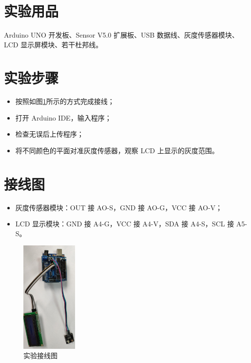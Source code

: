 \documentclass[UTF8, oneside]{ctexbook}
\begin{document}
\section{实验用品}
\paragraph{}
Arduino UNO 开发板、Sensor V5.0 扩展板、USB 数据线、灰度传感器模块、LCD 显示屏模块、若干杜邦线。

\section{实验步骤}
\begin{itemize}
    \item[(1)] 按照如图\ref{s6_line}所示的方式完成接线；
    \item[(2)] 打开 Arduino IDE，输入程序；
    \item[(3)] 检查无误后上传程序；
    \item[(4)] 将不同颜色的平面对准灰度传感器，观察 LCD 上显示的灰度范围。
\end{itemize}

\section{接线图}
\begin{itemize}
    \item 灰度传感器模块：OUT 接 AO-S，GND 接 AO-G，VCC 接 AO-V；
    \item LCD 显示模块：GND 接 A4-G，VCC 接 A4-V，SDA 接 A4-S，SCL 接 A5-S。
\end{itemize}
\begin{figure}[h]
    \centering
    \includegraphics[width=0.25\textwidth]{./result/sensor/6/lines2.png}
    \caption{实验接线图}
    \label{s6_line}
\end{figure}
\end{document}

